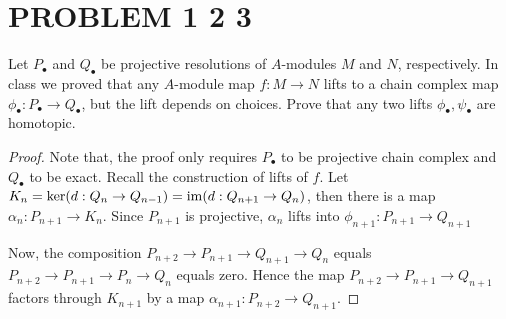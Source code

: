 \section{PROBLEM 1 2 3}

\begin{problem}[problem 1]
	\label{problem1}
	Let $P_\bullet$ and $Q_\bullet$ be projective  resolutions of $A$-modules $M$ and $N$, respectively. In class we proved that any $A$-module map $f: M \to N$ lifts to a chain complex map $\phi_\bullet: P_\bullet \to Q_\bullet$, but the lift depends on choices. Prove that any two lifts $\phi_\bullet, \psi_\bullet$ are homotopic.
\end{problem}

\begin{proof} 
	
	Note that, the proof only requires $P_\bullet$ to be projective chain complex and $Q_\bullet$ to be exact. Recall the construction of lifts of $f$. Let $K_n = \ker (d: Q_n \to Q_{n-1}) = \operatorname{im} (d: Q_{n+1} \to Q_n)$, then there is a map $\alpha_n: P_{n+1} \to K_n$. Since $P_{n+1}$ is projective, $\alpha_n$ lifts into $\phi_{n+1}: P_{n+1} \to Q_{n+1}$
	
	\begin{center}
	\end{center}
	
	Now, the composition $P_{n+2} \to P_{n+1} \to Q_{n+1} \to Q_{n}$ equals $P_{n+2} \to P_{n+1} \to P_n \to Q_{n}$ equals zero. Hence the map $P_{n+2} \to P_{n+1} \to Q_{n+1}$ factors through $K_{n+1}$ by a map $\alpha_{n+1}: P_{n+2} \to Q_{n+1}$.
	

\end{proof}
